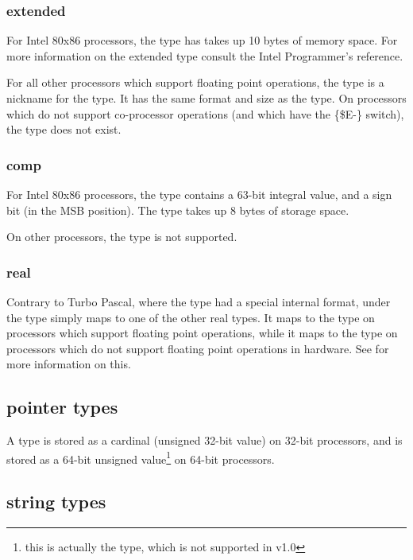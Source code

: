 \subsubsection{extended}

For Intel 80x86 processors, the  type has
takes up 10 bytes of memory space. For more information
on the extended type consult the Intel Programmer's reference.

For all other processors which support floating point operations,
the  type is a nickname for the  type. 
It has the same format and size as the  type. On
processors which do not support co-processor operations (and which have
the \{\$E-\} switch), the
 type does not exist.

\subsubsection{comp}

For Intel 80x86 processors, the  type contains
a 63-bit integral value, and a sign bit (in the MSB position).
The  type takes up 8 bytes of storage space.

On other processors, the  type is not supported.

\subsubsection{real}

Contrary to Turbo Pascal, where the  type had
a special internal format, under \fpc the  type
simply maps to one of the other real types. It maps to the
 type on processors which support floating
point operations, while it maps to the  type
on processors which do not support floating point operations
in hardware. See  for more information
on this.

\subsection{pointer types}

A  type is stored as a cardinal (unsigned 32-bit value) on
32-bit processors, and is stored as a 64-bit unsigned value\footnote{this
is actually the  type, which is not supported in \fpc v1.0}
on 64-bit processors.

\subsection{string types}

